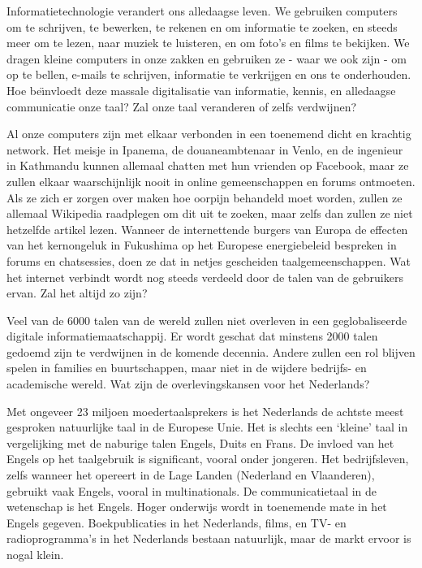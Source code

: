 \begin{multicols}{2}

Informatietechnologie verandert ons alledaagse leven. We gebruiken computers om te schrijven, te bewerken, te rekenen en om informatie te zoeken, en steeds meer om te lezen, naar muziek te luisteren, en om foto's en films te bekijken. We dragen kleine computers in onze zakken en gebruiken ze - waar we ook zijn - om op te bellen, e-mails te schrijven, informatie te verkrijgen en ons te onderhouden. Hoe be{\"\i}nvloedt  deze massale digitalisatie van informatie, kennis, en alledaagse communicatie onze taal? Zal onze taal veranderen of zelfs verdwijnen?

Al onze computers zijn met elkaar verbonden in een toenemend dicht en krachtig network.
Het meisje in Ipanema, de douaneambtenaar in Venlo, en de ingenieur in Kathmandu kunnen allemaal chatten met hun vrienden op Facebook, maar ze zullen elkaar waarschijnlijk nooit in online gemeenschappen en forums ontmoeten. Als ze zich er zorgen over maken hoe oorpijn behandeld moet worden, zullen ze allemaal Wikipedia raadplegen om dit uit te zoeken, maar zelfs dan zullen ze niet hetzelfde artikel lezen. Wanneer de internettende burgers van Europa de effecten van het kernongeluk in Fukushima op het Europese energiebeleid bespreken in forums en chatsessies, doen ze dat in netjes gescheiden taalgemeenschappen. Wat het internet verbindt wordt nog steeds verdeeld door de talen van de gebruikers ervan. Zal het altijd zo zijn?

Veel van de 6000 talen van de wereld zullen niet overleven in een geglobaliseerde digitale informatiemaatschappij. Er wordt geschat dat minstens 2000 talen  gedoemd zijn te verdwijnen in de komende decennia. Andere zullen een rol blijven spelen in families en buurtschappen, maar niet in de wijdere bedrijfs- en  academische wereld. Wat zijn de overlevingskansen voor het Nederlands?

Met ongeveer 23 miljoen moedertaalsprekers is het Nederlands de achtste meest gesproken natuurlijke taal in de Europese Unie. Het is slechts een `kleine' taal in vergelijking met de naburige talen Engels, Duits en Frans. De invloed van het Engels op het taalgebruik is significant, vooral onder jongeren. Het bedrijfsleven, zelfs wanneer het opereert in de Lage Landen (Nederland en Vlaanderen), gebruikt vaak Engels, vooral in multinationals. De communicatietaal in de wetenschap is het Engels. Hoger onderwijs wordt in toenemende mate in het Engels gegeven. Boekpublicaties in het Nederlands, films, en TV- en radioprogramma's in het Nederlands bestaan natuurlijk, maar de markt ervoor is nogal klein.


\end{multicols}
